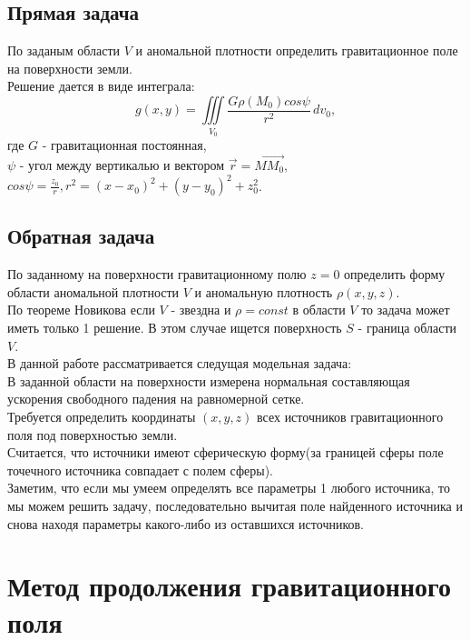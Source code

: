 \documentclass[12pt]{article}
\begin{document}
\subsection
{Прямая задача}
По заданым области $V$ и аномальной плотности определить гравитационное поле на поверхности земли.\\
Решение дается в виде интеграла:\\
\[g(x,y)=\iiint\limits_{V_0}\frac{G\rho(M_0)cos\psi}{r^2}\,dv_0,\] где $G$ - гравитационная постоянная,\\
$\psi$ - угол между вертикалью и вектором $\vec{r} = \overrightarrow{MM_0}$,\\
 $cos\psi=\displaystyle\frac{z_0}{r}, r^2=(x-x_0)^2+(y-y_0)^2+z_0^2$.



\subsection
{Обратная задача}

По заданному на поверхности гравитационному полю $z=0$ определить форму области аномальной плотности $V$ и аномальную плотность $\rho(x,y,z)$.\\
\newline
По теореме Новикова если $V$ - звездна и $\rho = const$ в области $V$ то задача может иметь только 1 решение. В этом случае ищется поверхность $S$ - граница области $V$.\\
\newline
В данной работе рассматривается следущая модельная задача:\\
В заданной области на поверхности измерена нормальная составляющая ускорения свободного падения на равномерной сетке. \\
Требуется определить координаты $(x,y,z)$ всех источников гравитационного поля под поверхностью земли.\\
Считается, что источники имеют сферическую форму(за границей сферы поле точечного источника совпадает с полем сферы).\\
Заметим, что если мы умеем определять все параметры 1 любого источника, то мы можем решить задачу, последовательно вычитая поле найденного источника и снова находя параметры какого-либо из оставшихся источников.

\section
{Метод продолжения гравитационного поля}
\end{document}
